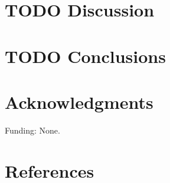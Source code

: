 \documentclass[review]{elsarticle}
\begin{document}
\section*{{\bfseries\sffamily TODO} Discussion}
\label{sec:org60deb34}
\section*{{\bfseries\sffamily TODO} Conclusions}
\label{sec:org2571a69}

\section*{Acknowledgments}
\label{sec:org2e4df9b}
Funding: None.
\section*{References}
\label{sec:org4e6be2f}
\begin{hangparas}{1.5em}{1}

\end{hangparas}
\end{document}
